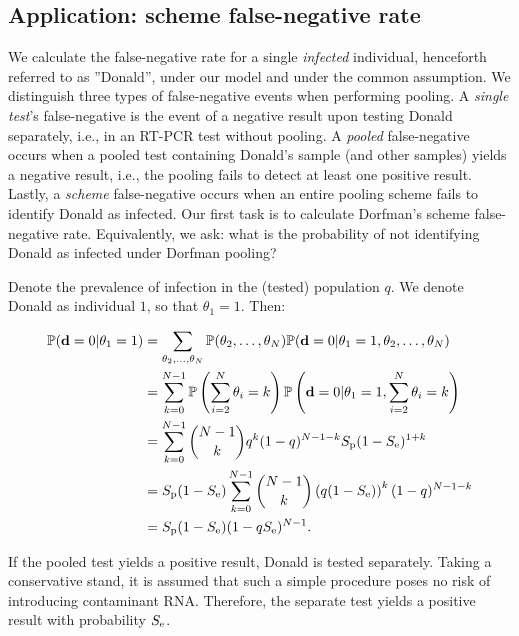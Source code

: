 \documentclass{article}
\begin{document}
\subsection*{Application: scheme false-negative rate}
We calculate the false-negative rate for a single \emph{infected}
individual, henceforth referred to as ''Donald'', under our model and
under the common assumption. We distinguish three types of
false-negative events when performing pooling. A \emph{single test}'s
false-negative is the event of a negative result upon testing Donald
separately, i.e., in an RT-PCR test without pooling. A \emph{pooled}
false-negative occurs when a pooled test containing Donald's sample
(and other samples) yields a negative result, i.e., the pooling fails
to detect at least one positive result. Lastly, a \emph{scheme}
false-negative occurs when an entire pooling scheme fails to identify
Donald as infected. Our first task is to calculate Dorfman's scheme
false-negative rate. Equivalently, we ask: what is the probability of
not identifying Donald as infected under Dorfman pooling?

Denote the prevalence of infection in the (tested) population $q$. We
denote Donald as individual $1$, so that $\theta_1=1$. Then:

\begin{align}
  \begin{split}
    \mathbb{P}(\mathbf{d}=0|\theta_1=1) &= \sum_{\theta_2,\dots,\theta_N}
    \mathbb{P}(\theta_2,\dots,\theta_N)
    \mathbb{P}(\mathbf{d}=0|\theta_1=1,\theta_2,\dots,\theta_N) \\
    &= \sum_{k=0}^{N-1}\mathbb{P}\left(\sum_{i=2}^N\theta_i=k\right)
    \mathbb{P}\left(\mathbf{d}=0|\theta_1=1,\sum_{i=2}^N\theta_i = k\right)\\
    &= \sum_{k=0}^{N-1}\binom{N-1}{k}q^k(1-q)^{N-1-k} S_\text{p}(1-S_\text{e})^{1+k}\\
    &= S_\text{p}(1-S_\text{e}) \sum_{k=0}^{N-1}\binom{N-1}{k}
    \left(q(1-S_\text{e})\right)^k(1-q)^{N-1-k}\\
    &= S_\text{p}(1-S_\text{e})(1-qS_\text{e})^{N-1}. \\
  \end{split}
\end{align}

If the pooled test yields a positive result, Donald is tested
separately. Taking a conservative stand, it is assumed that such a
simple procedure poses no risk of introducing contaminant
RNA. Therefore, the separate test yields a positive result with
probability $S_\text{e}$.
\end{document}
